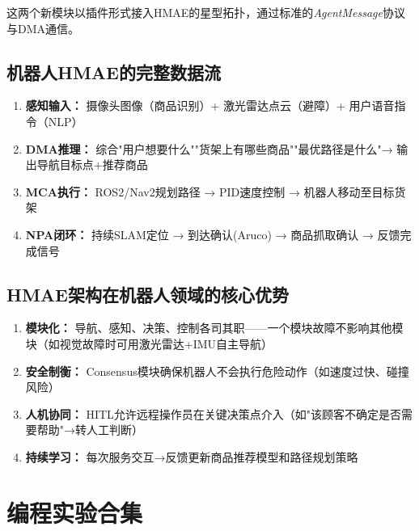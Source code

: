 \documentclass[11pt,a4paper]{ctexart}
\begin{document}
这两个新模块以插件形式接入HMAE的星型拓扑，通过标准的\emph{AgentMessage}协议与DMA通信。

\subsection{机器人HMAE的完整数据流}

\begin{enumerate}[nosep]
\item \textbf{感知输入：} 摄像头图像（商品识别）+ 激光雷达点云（避障）+ 用户语音指令（NLP）
\item \textbf{DMA推理：} 综合"用户想要什么""货架上有哪些商品""最优路径是什么"→ 输出导航目标点+推荐商品
\item \textbf{MCA执行：} ROS2/Nav2规划路径 → PID速度控制 → 机器人移动至目标货架
\item \textbf{NPA闭环：} 持续SLAM定位 → 到达确认(Aruco) → 商品抓取确认 → 反馈完成信号
\end{enumerate}

\subsection{HMAE架构在机器人领域的核心优势}

\begin{enumerate}[nosep]
\item \textbf{模块化：} 导航、感知、决策、控制各司其职——一个模块故障不影响其他模块（如视觉故障时可用激光雷达+IMU自主导航）
\item \textbf{安全制衡：} Consensus模块确保机器人不会执行危险动作（如速度过快、碰撞风险）
\item \textbf{人机协同：} HITL允许远程操作员在关键决策点介入（如"该顾客不确定是否需要帮助"→转人工判断）
\item \textbf{持续学习：} 每次服务交互→反馈更新商品推荐模型和路径规划策略
\end{enumerate}

\newpage

\section{编程实验合集}
\end{document}
